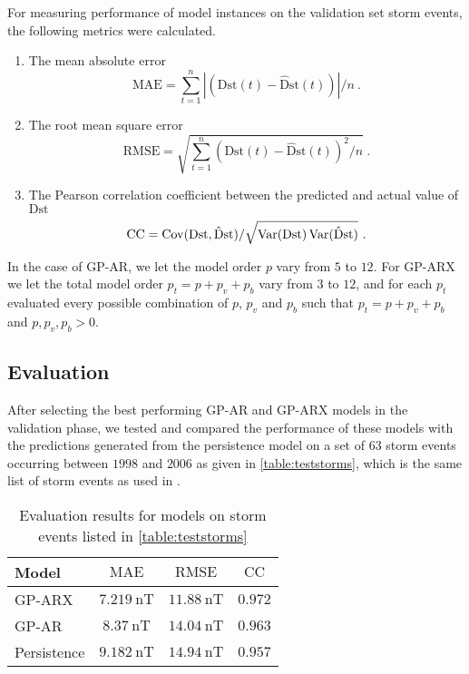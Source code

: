 For measuring performance of model instances on the validation set storm events, the following 
metrics were calculated.

\begin{enumerate}
    \item The mean absolute error
    \begin{equation}
        \mathrm{MAE} = \sum_{t=1}^{n} \left |(\mathrm{Dst}(t) - \mathrm{\hat{D}st}(t)) \right | / n \ .
    \end{equation}
    \item The root mean square error
    \begin{equation}
        \mathrm{RMSE} = \sqrt{\sum_{t=1}^{n} (\mathrm{Dst}(t) - \mathrm{\hat{D}st}(t))^2 / n} \ .
    \end{equation}
    \item The Pearson correlation coefficient between the predicted and actual value of 
    $\mathrm{Dst}$
    \begin{equation}
        \mathrm{CC} = \Cov(\mathrm{Dst}, \mathrm{\hat{D}st})/\sqrt{\Var(\mathrm{Dst}) \Var(\mathrm{\hat{D}st})} \ . 
    \end{equation}
\end{enumerate}
%
In the case of GP-AR, we let the model order $p$ vary from $5$ to $12$. For GP-ARX we let the 
total model order $p_t = p + p_v + p_b$ vary from $3$ to $12$, and for each $p_t$ evaluated every 
possible combination of $p$, $p_v$ and $p_b$ such that $p_t = p + p_v + p_b$ and 
$p, p_{v}, p_b > 0$.


\subsection*{Evaluation}\label{sec:gpOSAEval}

After selecting the best performing GP-AR and GP-ARX models in the validation phase, we tested and 
compared the performance of these models with the predictions generated from the persistence model 
on a set of $63$ storm events occurring between $1998$ and $2006$ as given in 
\cref{table:teststorms}, which is the same list of storm events as used in \citet{Ji2012}.

\begin{table}[ht]
    \centering
    \caption{Evaluation results for models on storm events listed in \cref{table:teststorms}}
    \label{table:results}
    \begin{tabular}{l c c c}
    \hline
    \textbf{Model} & $\mathrm{MAE}$ & $\mathrm{RMSE}$ & $\mathrm{CC}$\\ \hline
    GP-ARX & $\SI{7.219}{\nano\tesla}$ & $\SI{11.88}{\nano\tesla}$ & $0.972$\\
    GP-AR & $\SI{8.37}{\nano\tesla}$ & $\SI{14.04}{\nano\tesla}$ & $0.963$\\
    Persistence & $\SI{9.182}{\nano\tesla}$ & $\SI{14.94}{\nano\tesla}$ & $0.957$\\
    \hline
    \end{tabular}
\end{table}

